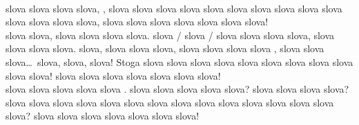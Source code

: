 \documentclass[ocha]{grampig}
\begin{document}
	\begin{minipage}{\width}
		\onehalfspacing
		{\Large {}} \\[-0.5em]
		
		slova slova slova slova, , slova slova slova slova slova slova slova slova slova slova slova slova slova slova, slova slova slova slova slova slova slova! \\[-1em]
		
		 slova slova, slova slova slova slova.
		slova / slova / slova slova slova slova, slova slova slova slova.
		slova, slova slova slova, slova slova slova slova , slova slova slova\ldots\ slova, slova, slova!
		Stoga slova slova slova slova slova slova slova slova slova slova slova!
		slova slova slova slova slova slova slova! \\[-1em]
		
		slova  slova slova slova slova . 
		slova slova slova slova slova?
		slova slova slova slova? slova slova slova slova slova slova slova slova slova slova slova slova slova slova slova?
		slova slova slova slova slova slova slova! \\[-2em]
		
		\begin{center}
		\end{center}
	\end{minipage}
\end{document}

